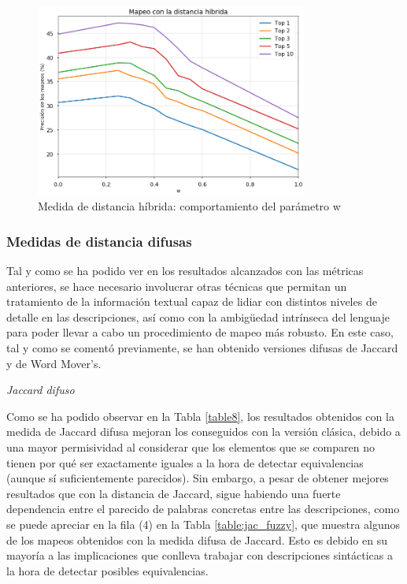 \begin{figure}[H]
    \centering
    \includegraphics[width=0.8\textwidth]{imagenes/resultados/plot/rr.png}
    \caption{Medida de distancia híbrida: comportamiento del parámetro w }
    \label{fig:plot_w}
\end{figure}


\subsubsection{Medidas de distancia difusas}

Tal y como se ha podido ver en los resultados alcanzados con las métricas anteriores, se hace necesario involucrar otras técnicas que permitan un tratamiento de la información textual capaz de lidiar con distintos niveles de detalle en las descripciones, así como con la ambigüedad intrínseca del lenguaje para poder llevar a cabo un procedimiento de mapeo más robusto. En este caso, tal y como se comentó previamente, se han obtenido versiones difusas de Jaccard y de Word Mover's. 

\begin{flushleft}
   \textit{Jaccard difuso}
\end{flushleft}

Como se ha podido observar en la Tabla \ref{table8}, los resultados obtenidos con la medida de Jaccard difusa mejoran los conseguidos con la versión clásica, debido a una mayor permisividad al considerar que los elementos que se comparen no tienen por qué ser exactamente iguales a la hora de detectar equivalencias (aunque sí suficientemente parecidos). Sin embargo, a pesar de obtener mejores resultados que con la distancia de Jaccard, sigue habiendo una fuerte dependencia entre el parecido de palabras concretas entre las descripciones, como se puede apreciar en la fila (4) en la Tabla \ref{table:jac_fuzzy}, que muestra algunos de los mapeos obtenidos con la medida difusa de Jaccard. Esto es debido en su mayoría a las implicaciones que conlleva trabajar con descripciones sintácticas a la hora de detectar posibles equivalencias.

